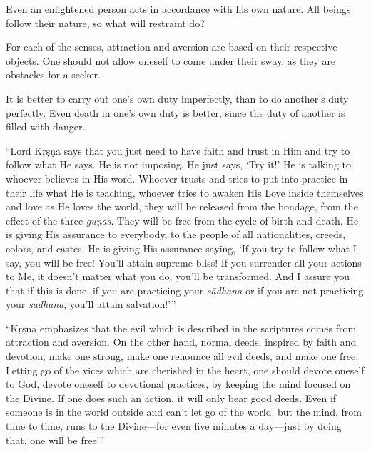 {Even an enlightened person acts in accordance with his own nature. All beings follow their nature, so what will restraint do?}

{For each of the senses, attraction and aversion are based on their respective objects. One should not allow oneself to come under their sway, as they are obstacles for a seeker.}

{It is better to carry out one’s own duty imperfectly, than to do another's duty perfectly. Even death in one’s own duty is better, since the duty of another is filled with danger.}

\enquote{Lord Kṛṣṇa says that you just need to have faith and trust in Him and try to follow what He says. He is not imposing. He just says, \enquote{Try it!} He is talking to whoever believes in His word. Whoever trusts and tries to put into practice in their life what He is teaching, whoever tries to awaken His Love inside themselves and love as He loves the world, they will be released from the bondage, from the effect of the three \textit{guṇas}. They will be free from the cycle of birth and death. He is giving His assurance to everybody, to the people of all nationalities, creeds, colors, and castes. He is giving His assurance saying, \enquote{If you try to follow what I say, you will be free! You’ll attain supreme bliss! If you surrender all your actions to Me, it doesn’t matter what you do, you’ll be transformed. And I assure you that if this is done, if you are practicing your \textit{sādhana} or if you are not practicing your \textit{sādhana}, you’ll attain salvation!}}

\enquote{Kṛṣṇa emphasizes that the evil which is described in the scriptures comes from attraction and aversion. On the other hand, normal deeds, inspired by faith and devotion, make one strong, make one renounce all evil deeds, and make one free. Letting go of the vices which are cherished in the heart, one should devote oneself to God, devote oneself to devotional practices, by keeping the mind focused on the Divine. If one does such an action, it will only bear good deeds. Even if someone is in the world outside and can’t let go of the world, but the mind, from time to time, runs to the Divine---for even five minutes a day---just by doing that, one will be free!}


